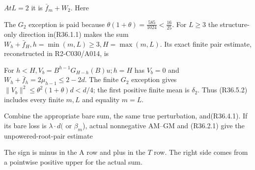 
\(At L=2\) it is \(\bar f_m+W_{2}\). Here


The \(G_{2}\) exception is paid because \(\theta(1+\theta)=\frac{585}{1024}<\frac{16}{25}\). For \(L\ge 3\) the structure-only direction in(R36.1.1) makes the sum \(W_h+\bar f_H,\allowbreak \allowbreak  h=\min(m,\allowbreak \allowbreak L)\ge 3,\allowbreak \allowbreak  H=\max(m,\allowbreak \allowbreak L)\). Its exact finite pair estimate, reconstructed in R2-C030/A014, is


For \(h<H,\allowbreak \allowbreak  V_b=B^{h-1}G_{H-h}(B)u; h=H\) has \(V_b=0\) and \(W_h+\bar f_h=2\mu_{h-1}\le 2-2d\). The finite \(G_{2}\) exception gives \(\lVert V_b\rVert ^2\le \theta^2(1+\theta)d<d/4\); the first positive finite mean is \(\delta_2\). Thus (R36.5.2) includes every finite \(m,\allowbreak \allowbreak L\) and equality \(m=L\).

Combine the appropriate bare sum, the same true perturbation, and(R36.4.1). If its bare loss is \(\lambda\cdot d (\) or \(\beta_m\)), actual nonnegative AM--GM and (R36.2.1) give the unpowered-root-pair estimate


The sign is minus in the A row and plus in the \(T\) row. The right side comes from a pointwise positive upper for the actual sum.

